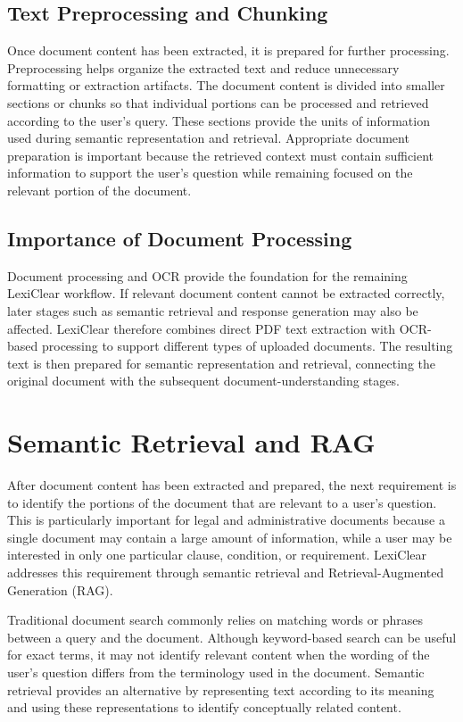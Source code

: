 \documentclass[12pt,a4paper,oneside]{report}
\begin{document}
\subsection{Text Preprocessing and Chunking}

Once document content has been extracted, it is prepared for further
processing. Preprocessing helps organize the extracted text and reduce
unnecessary formatting or extraction artifacts. The document content is divided into smaller sections or chunks so that
individual portions can be processed and retrieved according to the user's
query. These sections provide the units of information used during semantic
representation and retrieval. Appropriate document preparation is important because the retrieved
context must contain sufficient information to support the user's question while
remaining focused on the relevant portion of the document.

\subsection{Importance of Document Processing}

Document processing and OCR provide the foundation for the remaining
LexiClear workflow. If relevant document content cannot be extracted
correctly, later stages such as semantic retrieval and response generation
may also be affected. LexiClear therefore combines direct PDF text extraction with OCR-based
processing to support different types of uploaded documents. The resulting
text is then prepared for semantic representation and retrieval, connecting
the original document with the subsequent document-understanding stages.

\section{Semantic Retrieval and RAG}

After document content has been extracted and prepared, the next requirement
is to identify the portions of the document that are relevant to a user's
question. This is particularly important for legal and administrative
documents because a single document may contain a large amount of information,
while a user may be interested in only one particular clause, condition, or
requirement. LexiClear addresses this requirement through semantic retrieval
and Retrieval-Augmented Generation (RAG).

Traditional document search commonly relies on matching words or phrases
between a query and the document. Although keyword-based search can be useful
for exact terms, it may not identify relevant content when the wording of the
user's question differs from the terminology used in the document. Semantic
retrieval provides an alternative by representing text according to its
meaning and using these representations to identify conceptually related
content.
\end{document}
